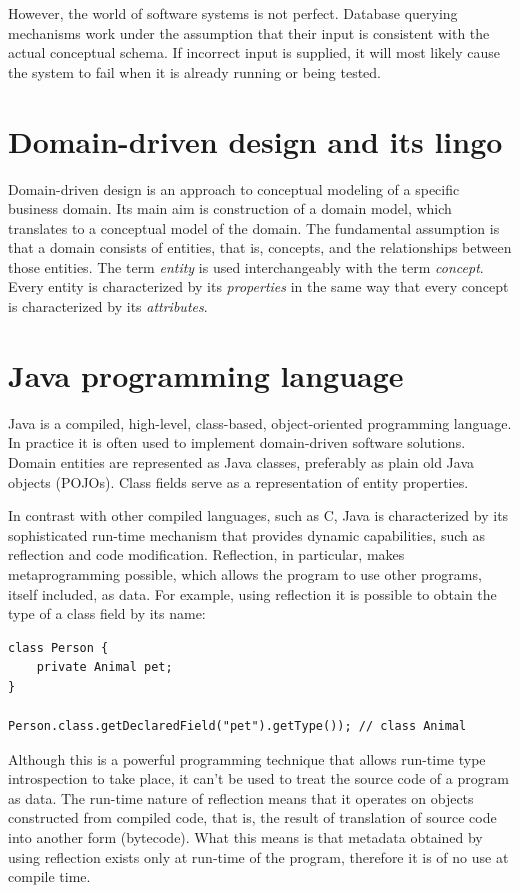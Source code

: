 \n

However, the world of software systems is not perfect. Database querying mechanisms work under the assumption that their input is consistent with the actual conceptual schema. If incorrect input is supplied, it will most likely cause the system to fail when it is already running or being tested.

\section{Domain-driven design and its lingo}

Domain-driven design is an approach to conceptual modeling of a specific business domain. Its main aim is construction of a domain model, which translates to a conceptual model of the domain. The fundamental assumption is that a domain consists of entities, that is, concepts, and the relationships between those entities. The term \textit{entity} is used interchangeably with the term \textit{concept}. Every entity is characterized by its \textit{properties} in the same way that every concept is characterized by its \textit{attributes}.

\section{Java programming language}
Java is a compiled, high-level, class-based, object-oriented programming language. In practice it is often used to implement domain-driven software solutions. Domain entities are represented as Java classes, preferably as plain old Java objects (POJOs). Class fields serve as a representation of entity properties.

\n

In contrast with other compiled languages, such as C, Java is characterized by its sophisticated run-time mechanism that provides dynamic capabilities, such as reflection and code modification. Reflection, in particular, makes metaprogramming possible, which allows the program to use other programs, itself included, as data. For example, using reflection it is possible to obtain the type of a class field by its name:

\begin{verbatim}
class Person {
    private Animal pet;
}

Person.class.getDeclaredField("pet").getType()); // class Animal
\end{verbatim}

Although this is a powerful programming technique that allows run-time type introspection to take place, it can’t be used to treat the source code of a program as data. The run-time nature of reflection means that it operates on objects constructed from compiled code, that is, the result of translation of source code into another form (bytecode). What this means is that metadata obtained by using reflection exists only at run-time of the program, therefore it is of no use at compile time.

